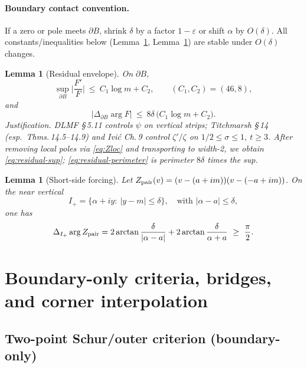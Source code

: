 \documentclass[11pt]{article}
\numberwithin{equation}{section}
\newtheorem{lemma}[theorem]{Lemma}
\theoremstyle{remark}
\begin{document}
\paragraph{Boundary contact convention.}
If a zero or pole meets $\partial B$, shrink $\delta$ by a factor $1-\varepsilon$ or shift $\alpha$ by $O(\delta)$. All constants/inequalities below (Lemma~\ref{lem:residual}, Lemma~\ref{lem:short-side}) are stable under $O(\delta)$ changes.

\begin{lemma}[Residual envelope]\label{lem:residual}
On $\partial B$,
\begin{equation}\label{eq:residual-sup}
\sup_{\partial B}\Big|\frac{F'}{F}\Big|\ \le\ C_1\log m + C_2,\qquad (C_1,C_2)=(46,8),
\end{equation}
and
\begin{equation}\label{eq:residual-perimeter}
\big|\Delta_{\partial B}\arg F\big|\ \le\ 8\delta\,\big(C_1\log m+C_2\big).
\end{equation}
\emph{Justification.} DLMF §\,5.11 controls $\psi$ on vertical strips; Titchmarsh §\,14 (esp.\ Thms.\,14.5–14.9) and Ivi\'c Ch.\,9 control $\zeta'/\zeta$ on $1/2\le\sigma\le 1,\ t\ge 3$. After removing local poles via \eqref{eq:Zloc} and transporting to width-2, we obtain \eqref{eq:residual-sup}; \eqref{eq:residual-perimeter} is perimeter $8\delta$ times the sup.
\end{lemma}

\begin{lemma}[Short-side forcing]\label{lem:short-side}
Let $Z_{\rm pair}(v)=(v-(a+im))(v-(-a+im))$. On the near vertical
\[
I_+=\{\alpha+i y:\ |y-m|\le \delta\},\quad\text{with }|\alpha-a|\le\delta,
\]
one has
\begin{equation}\label{eq:short-side}
\Delta_{I_+}\arg Z_{\rm pair}
=2\arctan\frac{\delta}{|\alpha-a|}+2\arctan\frac{\delta}{\alpha+a}\ \ge\ \frac{\pi}{2}.
\end{equation}
\end{lemma}

\section{Boundary-only criteria, bridges, and corner interpolation}\label{sec:criteria}

\subsection{Two-point Schur/outer criterion (boundary-only)}\label{subsec:schur-criterion}
\end{document}
